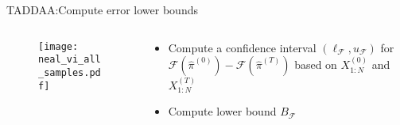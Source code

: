 \documentclass[10pt,xcolor=table]{beamer}
\begin{document}
\begin{frame}{TADDAA:Compute error lower bounds}
\begin{columns}[T]
  \begin{column}{0.5\linewidth}
\begin{figure}[p]
    \centering 
    \texttt{[image: neal\_vi\_all\_samples.pdf]}
\end{figure}
  \end{column}
  \begin{column}{0.5 \linewidth}
        \begin{itemize}
                \item Compute a confidence interval $(\ell_{\mathcal{F}}, u_{\mathcal{F}})$ for $\mathcal{F}(\hat{\pi}^{(0)})-\mathcal{F}(\hat{\pi}^{(T)})$ based on $X_{1: N}^{(0)}$ and $X_{1: N}^{(T)}$
                \item Compute lower bound $B_{\mathcal{F}}$
        \end{itemize}
  \end{column}
  \end{columns}
\end{frame}

\end{document}
